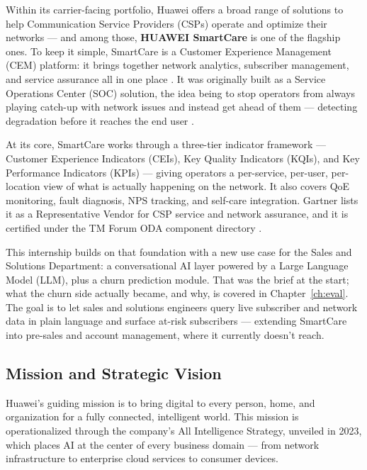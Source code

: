 Within its carrier-facing portfolio, Huawei offers a broad range of solutions to help 
Communication Service Providers (CSPs) operate and optimize their networks --- and among 
those, \textbf{HUAWEI SmartCare} is one of the flagship ones. To keep it simple, 
SmartCare is a Customer Experience Management (CEM) platform: it brings together network 
analytics, subscriber management, and service assurance all in one place 
\cite{huawei_smartcare_cem}. It was originally built as a Service Operations Center (SOC) 
solution, the idea being to stop operators from always playing catch-up with network 
issues and instead get ahead of them --- detecting degradation before it reaches the end 
user \cite{huawei_smartcare_soc}.

At its core, SmartCare works through a three-tier indicator framework --- Customer 
Experience Indicators (CEIs), Key Quality Indicators (KQIs), and Key Performance 
Indicators (KPIs) --- giving operators a per-service, per-user, per-location view of what 
is actually happening on the network. It also covers QoE monitoring, fault
diagnosis, NPS tracking, and self-care integration. Gartner lists it as a
Representative Vendor for CSP service and network assurance, and it is certified
under the TM Forum ODA component directory
\cite{huawei_gartner}\cite{huawei_tmforum}.

This internship builds on that foundation with a new use case for the Sales and
Solutions Department: a conversational AI layer powered by a Large Language Model
(LLM), plus a churn prediction module. That was the brief at the start; what the
churn side actually became, and why, is covered in Chapter~\ref{ch:eval}. The
goal is to let sales and solutions engineers query live subscriber and network
data in plain language and surface at-risk subscribers --- extending SmartCare
into pre-sales and account management, where it currently doesn't reach.

\subsection{Mission and Strategic Vision}

Huawei's guiding mission is to bring digital to every person, home, and organization 
for a fully connected, intelligent world. This mission is operationalized through the 
company's All Intelligence Strategy, unveiled in 2023, which places AI at the center 
of every business domain --- from network infrastructure to enterprise cloud services 
to consumer devices.

